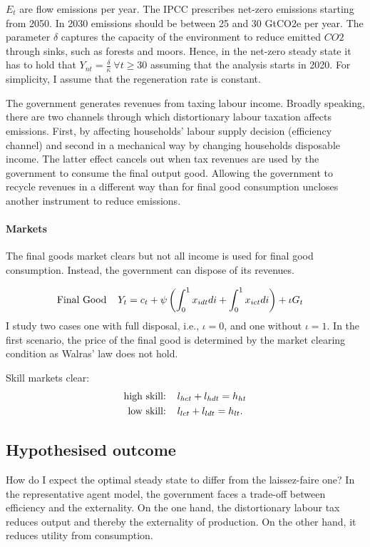 $E_t$ are flow emissions per year. The IPCC prescribes net-zero emissions starting from 2050. In 2030 emissions should be between 25 and 30 GtCO2e per year. The parameter $\delta$ captures the capacity of the environment to reduce emitted $CO2$ through sinks, such as forests and moors. Hence, in the net-zero steady state it has to hold that $Y_{nt}=\frac{\delta}{\kappa}\ \forall t\geq 30$ assuming that the analysis starts in 2020. For simplicity, I assume that the regeneration rate is constant. 

The government generates revenues from taxing labour income. 
Broadly speaking, there are two channels through which distortionary labour taxation affects emissions. First, by affecting households' labour supply decision (efficiency channel) and second in a mechanical way by changing households disposable income. The latter effect cancels out when tax revenues are used by the government to consume the final output good. Allowing the government to recycle revenues in a different way than for final good consumption uncloses another instrument to reduce emissions. 

\paragraph{Markets}
The final goods market clears but not all income is used for final good consumption.  Instead, the government can dispose of its revenues.
 
\begin{align*}
\text{Final Good}\hspace{4mm}& Y_{t}=c_t+\psi\left(\int_{0}^1x_{idt}di+\int_{0}^1x_{ict}di\right)+\iota G_t
\end{align*}
 I study two cases one with full disposal, i.e., $\iota=0$, and one without $\iota=1$. In the first scenario, the price of the final good is determined by the market clearing condition as Walras' law does not hold. 

Skill markets clear: 
\begin{align}
\text{high skill:}\hspace{4mm}& l_{hct}+l_{hdt}=h_{ht}\\
\text{low skill:}\hspace{4mm}&l_{lct}+l_{ldt}=h_{lt}.
\end{align}

\subsection{Hypothesised outcome}
How do I expect the optimal steady state to differ from the laissez-faire one? 
In the representative agent model, the government faces a trade-off  between efficiency and the externality. 
On the one hand, the distortionary labour tax reduces output and thereby the externality of production. On the other hand, it reduces utility from consumption.

